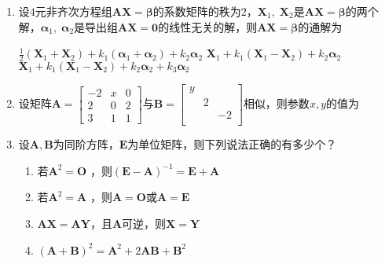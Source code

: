 \documentclass[11pt,a4paper]{ctexart}
\begin{document}
\begin{framed}
\begin{enumerate}
        \item 设\(4\)元非齐次方程组\(\boldsymbol{AX} = \boldsymbol{\beta}\)的系数矩阵的秩为\(2\)，\(\boldsymbol{X}_1,\; \boldsymbol{X}_2\)是\(\boldsymbol{AX} = \boldsymbol{\beta}\)的两个解，\(\boldsymbol{\alpha}_1,\; \boldsymbol{\alpha}_2\)是导出组\(\boldsymbol{AX} = \boldsymbol{0}\)的线性无关的解，则\(\boldsymbol{AX} = \boldsymbol{\beta}\)的通解为\kh{}
        
        {$\displaystyle\frac{1}{2}(\boldsymbol{X}_1 + \boldsymbol{X}_2) + k_1 (\boldsymbol{\alpha}_1 + \boldsymbol{\alpha}_2) + k_2 \boldsymbol{\alpha}_2$}
        {$\displaystyle\boldsymbol{X}_1 + k_1(\boldsymbol{X}_1 - \boldsymbol{X}_2)  + k_2 \boldsymbol{\alpha}_2$}
        {$\displaystyle\boldsymbol{X}_1 + k_1 (\boldsymbol{X}_1 - \boldsymbol{X}_2  ) + k_2 \boldsymbol{\alpha}_2 + k_3 \boldsymbol{\alpha}_2$}

        \item 设矩阵\(\displaystyle\boldsymbol{A} = \begin{bmatrix}
            -2 & x & 0 \\ 2 & 0 & 2 \\ 3 & 1 & 1
        \end{bmatrix}\)与\(\displaystyle \boldsymbol{B}  = \begin{bmatrix}
            y & & \\ & 2 & \\ & & -2\\
        \end{bmatrix}\)相似，则参数\(x, y\)的值为\kh{} 

        \item 设\(\boldsymbol{A}, \boldsymbol{B}\)为同阶方阵，\(\boldsymbol{E}\)为单位矩阵，则下列说法正确的有多少个？\kh{}
        \begin{enumerate}
            \item 若\(\boldsymbol{A}^2 = \boldsymbol{O}\) ，则\((\boldsymbol{E} - \boldsymbol{A})^{-1} = \boldsymbol{E} + \boldsymbol{A}\)
            \item 若\(\boldsymbol{A}^2 = \boldsymbol{A}\) ，则\(\boldsymbol{A} = \boldsymbol{O}\)或\(\boldsymbol{A} = \boldsymbol{E}\)
            \item \(\boldsymbol{AX} = \boldsymbol{AY}\)，且\(\boldsymbol{A}\)可逆，则\(\boldsymbol{X} = \boldsymbol{Y}\)
            \item \((\boldsymbol{A} + \boldsymbol{B})^2 = \boldsymbol{A}^2 + 2 \boldsymbol{AB} + \boldsymbol{B}^2\)
        \end{enumerate}


\end{enumerate}
\end{framed}
\end{document}

